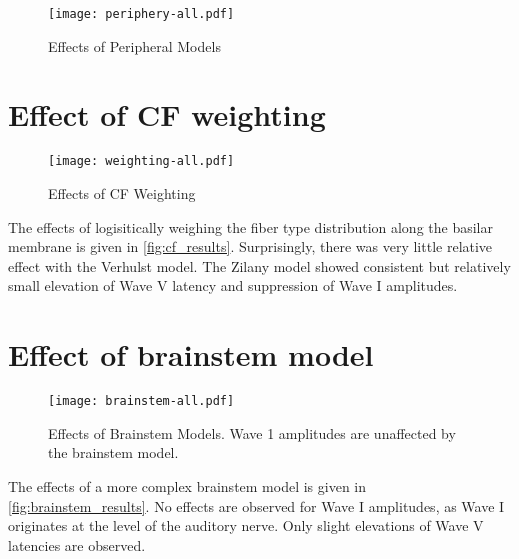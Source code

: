\begin{figure}[htbp]
	\centering
	\texttt{[image: periphery-all.pdf]}
	\caption[Effects of Peripheral Models]{Effects of Peripheral Models}
	\label{fig:periphery_results}
\end{figure}



\section{Effect of CF weighting} %
\label{sec:effect_of_cf_weighting}
\begin{figure}[htbp]
	\centering
	\texttt{[image: weighting-all.pdf]}
	\caption[Effects of CF Weighting]{Effects of CF Weighting}
	\label{fig:cf_results}
\end{figure}

The effects of logisitically weighing the fiber type distribution along the basilar membrane is given in \autoref{fig:cf_results}.  Surprisingly, there was very little relative effect with the Verhulst model.  The Zilany model showed consistent but relatively small elevation of Wave V latency and suppression of Wave I amplitudes. 

\section{Effect of brainstem model} %
\label{sec:effect_of_brainstem_model}
\begin{figure}[htbp]
	\centering
	\texttt{[image: brainstem-all.pdf]}
	\caption[Effects of Brainstem Models]{Effects of Brainstem Models.  Wave 1 amplitudes are unaffected by the brainstem model.}
	\label{fig:brainstem_results}
\end{figure}

The effects of a more complex brainstem model is given in \autoref{fig:brainstem_results}.  No effects are observed for Wave I amplitudes, as Wave I originates at the level of the auditory nerve.  Only slight elevations of Wave V latencies are observed.  

